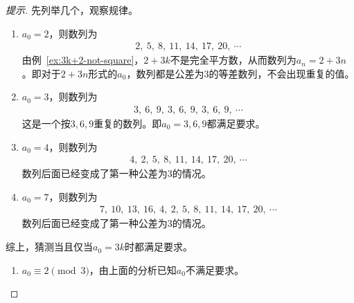 \begin{proof}[提示]
  先列举几个，观察规律。

  \begin{enumerate}
  \item $a_0 = 2$，则数列为
    \begin{align*}
      2,\ 5,\ 8,\ 11,\ 14,\ 17,\ 20,\ \cdots
    \end{align*}
    由例~\ref{ex:3k+2-not-square}，$2+3k$不是完全平方数，从而数列为$a_n = 2 + 3n$。即对于$2+3n$形式的$a_0$，数列都是公差为3的等差数列，不会出现重复的值。

  \item $a_0=3$，则数列为
    \begin{align*}
      3,\ 6,\ 9,\ 3,\ 6,\ 9,\ 3,\ 6,\ 9,\ \cdots
    \end{align*}
    这是一个按$3,6,9$重复的数列。即$a_0=3,6,9$都满足要求。

  \item $a_0=4$，则数列为
    \begin{align*}
      4,\ 2,\ 5,\ 8,\ 11,\ 14,\ 17,\ 20,\ \cdots
    \end{align*}
    数列后面已经变成了第一种公差为3的情况。
    
  \item $a_0=7$，则数列为
    \begin{align*}
      7,\ 10,\ 13,\ 16,\ 4,\ 2,\ 5,\ 8,\ 11,\ 14,\ 17,\ 20,\ \cdots
    \end{align*}
    数列后面已经变成了第一种公差为3的情况。
  \end{enumerate}

  综上，猜测当且仅当$a_0 = 3k$时都满足要求。

  \begin{enumerate}
  \item $a_0\equiv2\pmod3$，由上面的分析已知$a_0$不满足要求。
    

\end{enumerate}
\end{proof}
